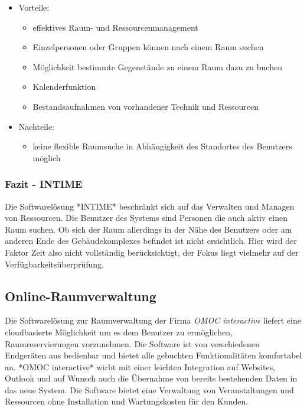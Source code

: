 \begin{itemize}
	\item Vorteile:
		\begin{itemize}
			\item effektives Raum- und Ressourcenmanagement
			\item Einzelpersonen oder Gruppen können nach einem Raum suchen
			\item Möglichkeit bestimmte Gegenstände zu einem Raum dazu zu buchen
			\item Kalenderfunktion
			\item Bestandsaufnahmen von vorhandener Technik und Ressourcen
		\end{itemize}
	\item Nachteile:
		\begin{itemize}
			\item keine flexible Raumsuche in Abhängigkeit des Standortes des Benutzers möglich
		\end{itemize}
\end{itemize}

\subsubsection{Fazit - INTIME}
\label{sec:Fazit - INTIME}

Die Softwarelösung *INTIME* beschränkt sich auf das Verwalten und Managen von
Ressourcen. Die Benutzer des Systems sind Personen die auch aktiv einen Raum
suchen. Ob sich der Raum allerdings in der Nähe des Benutzers oder am anderen
Ende des Gebäudekomplexes befindet ist nicht ersichtlich. Hier wird der Faktor
Zeit also nicht vollständig berücksichtigt, der Fokus liegt vielmehr auf der
Verfügbarkeitsüberprüfung.

\subsection{Online-Raumverwaltung}
\label{sec:Online-Raumverwaltung}

Die Softwarelösung zur Raumverwaltung der Firma \textit{OMOC interactive} liefert eine
cloudbasierte Möglichkeit um es dem Benutzer zu ermöglichen, Raumreservierungen
vorzunehmen. Die Software ist von verschiedenen Endgeräten aus bedienbar und
bietet alle gebuchten Funktionalitäten komfortabel an. *OMOC interactive* wirbt
mit einer leichten Integration auf Websites, Outlook und auf Wunsch auch die
Übernahme von bereits bestehenden Daten in das neue System. Die Software bietet
eine Verwaltung von Veranstaltungen und Ressourcen ohne Installation und
Wartungskosten für den Kunden.

